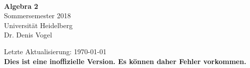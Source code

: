 \documentclass[a4paper, 12pt]{scrartcl}
\begin{document}
\begin{titlepage}
	
	\begin{center}
		\ \\ 
		\vspace{4cm}
		{\huge{ \textbf{ Algebra 2}}}\\
		\vspace{0.8cm}
		{\Large Sommersemester 2018}\\
		\vspace{0.5cm}
		{\Large Universit\"at Heidelberg}
		\\
		\vspace{1cm}
		{Dr. Denis Vogel}
		\vspace{2cm}
		\normalsize{
			\begin{center}
				Letzte Aktualisierung: \today\\
				\textbf{Dies ist eine inoffizielle Version. Es können daher Fehler vorkommen.}
			\end{center}
		}
	\end{center}
	
\end{titlepage}
\tableofcontents



\printindex
\end{document}
